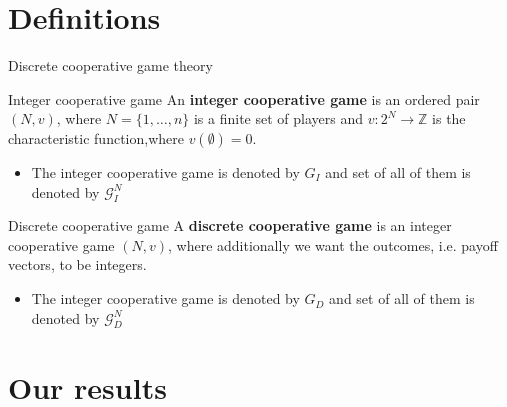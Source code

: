 \documentclass{beamer}
\begin{document}



\section{Definitions} %


\begin{frame}{Discrete cooperative game theory}
    \begin{block}{Integer cooperative game}
        An \textbf{integer cooperative game} is an ordered pair $(N,v)$, where $N=\{1,\dots,n\}$ is a finite set of players and $v\colon 2^N \to \mathbb{Z}$ is the characteristic function,where $v(\emptyset) = 0$.
    \end{block}
    \begin{itemize}
        \item The integer cooperative game is denoted by $G_I$ and set of all of them is denoted by $\mathcal{G}_I^N$
    \end{itemize}
    \begin{block}{Discrete cooperative game}
        A \textbf{discrete cooperative game} is an integer cooperative game $(N,v)$, where additionally we want the outcomes, i.e. payoff vectors, to be integers.
    \end{block}
    \begin{itemize}
        \item The integer cooperative game is denoted by $G_D$ and set of all of them is denoted by $\mathcal{G}_D^N$
    \end{itemize}
\end{frame}



\section{Our results}
\end{document}
